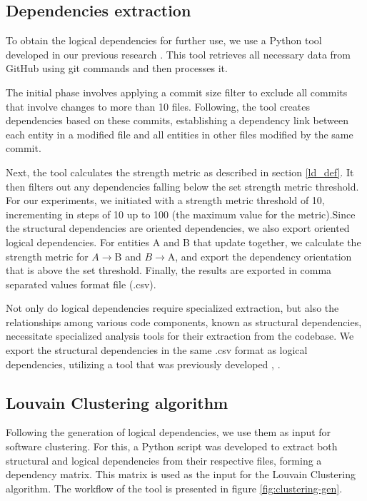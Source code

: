 \documentclass[conference, a4paper]{IEEEtran}
\begin{document}
\subsection{Dependencies extraction}

To obtain the logical dependencies for further use, we use a Python tool developed in our previous research \cite{articlekeyclass23}. This tool retrieves all necessary data from GitHub \cite{ApacheAntGitHub} using git commands and then processes it. 

The initial phase involves applying a commit size filter to exclude all commits that involve changes to more than 10 files. Following, the tool creates dependencies based on these commits, establishing a dependency link between each entity in a modified file and all entities in other files modified by the same commit. 

Next, the tool calculates the strength metric as described in section \ref{ld_def}. It then filters out any dependencies falling below the set strength metric threshold. For our experiments, we initiated with a strength metric threshold of 10, incrementing in steps of 10 up to 100 (the maximum value for the metric).Since the structural dependencies are oriented dependencies, we also export oriented logical dependencies. For entities A and B that update together, we calculate the strength metric for $A \rightarrow $B and $B \rightarrow $A, and export the dependency orientation that is above the set threshold. Finally, the results are exported in comma separated values format file (.csv). 

Not only do logical dependencies require specialized extraction, but also the relationships among various code components, known as structural dependencies, necessitate specialized analysis tools for their extraction from the codebase. We export the structural dependencies in the same .csv format as logical dependencies, utilizing a tool that was previously developed \cite{articlekeyclass23}, \cite{Finding-key-classes}.


\subsection{Louvain Clustering algorithm}

Following the generation of logical dependencies, we use them as input for software clustering. For this, a Python script was developed to extract both structural and logical dependencies from their respective files, forming a dependency matrix. This matrix is used as the input for the Louvain Clustering algorithm. The workflow of the tool is presented in figure \ref{fig:clustering-gen}.
\end{document}
